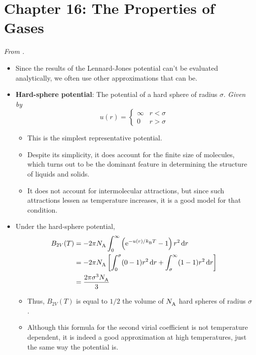 \documentclass[../notes.tex]{subfiles}
\begin{document}
\section{Chapter 16: The Properties of Gases}
\emph{From \textcite{bib:McQuarrieSimon}.}
\begin{itemize}
    \item Since the results of the Lennard-Jones potential can't be evaluated analytically, we often use other approximations that can be.
    \item \textbf{Hard-sphere potential}: The potential of a hard sphere of radius $\sigma$. \emph{Given by}
    \begin{equation*}
        u(r) =
        \begin{cases}
            \infty & r<\sigma\\
            0 & r>\sigma
        \end{cases}
    \end{equation*}
    \begin{itemize}
        \item This is the simplest representative potential.
        \item Despite its simplicity, it does account for the finite size of molecules, which turns out to be the dominant feature in determining the structure of liquids and solids.
        \item It does not account for intermolecular attractions, but since such attractions lessen as temperature increases, it is a good model for that condition.
    \end{itemize}
    \item Under the hard-sphere potential,
    \begin{align*}
        B_{2V}(T) &= -2\pi\NA\int_0^\infty\left( \e[-u(r)/\kB T]-1 \right)r^2\dd{r}\\
        &= -2\pi\NA\left[ \int_0^\sigma(0-1)r^2\dd{r}+\int_\sigma^\infty(1-1)r^2\dd{r} \right]\\
        &= \frac{2\pi\sigma^3\NA}{3}
    \end{align*}
    \begin{itemize}
        \item Thus, $B_{2V}(T)$ is equal to $1/2$ the volume of $\NA$ hard spheres of radius $\sigma$.
        \item Although this formula for the second virial coefficient is not temperature dependent, it is indeed a good approximation at high temperatures, just the same way the potential is.
    \end{itemize}

\end{itemize}
\end{document}
